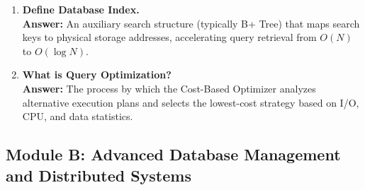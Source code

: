 \begin{enumerate}[label=\textbf{TA\arabic*.},leftmargin=1.2cm]
\item \textbf{Define Database Index.} \\
\textbf{Answer:} An auxiliary search structure (typically B+ Tree) that maps search keys to physical storage addresses, accelerating query retrieval from $O(N)$ to $O(\log N)$.

\item \textbf{What is Query Optimization?} \\
\textbf{Answer:} The process by which the Cost-Based Optimizer analyzes alternative execution plans and selects the lowest-cost strategy based on I/O, CPU, and data statistics.
\end{enumerate}

\subsection{Module B: Advanced Database Management and Distributed Systems}
